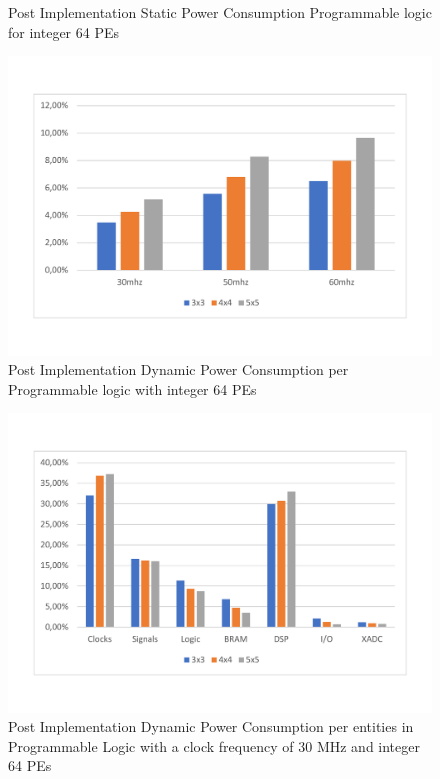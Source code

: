 \begin{itemize}
\begin{figure}[!htbp]
\caption{Post Implementation Static Power Consumption Programmable logic for integer 64 PEs }
\label{fig:staticpowint64}
\end{figure}
\begin{figure}[!htbp]
\centering
\captionsetup{justification=centering}
\includegraphics[scale=0.5,angle=0]{./figure/graphs/power_pldyn_int64_freq.pdf}
\caption{Post Implementation Dynamic Power Consumption per Programmable logic with integer 64 PEs}
\label{fig:dynpowint64}
\end{figure}
\begin{figure}[!htbp]
\centering
\captionsetup{justification=centering}
\includegraphics[scale=0.6,angle=0]{./figure/graphs/power_pldyn_div_int64_freq_30mhz.pdf}
\caption{Post Implementation Dynamic Power Consumption per entities in Programmable Logic with a clock frequency of 30 MHz and integer 64 PEs}
\label{fig:dynpowint64ent30}
\end{figure}


\end{itemize}
